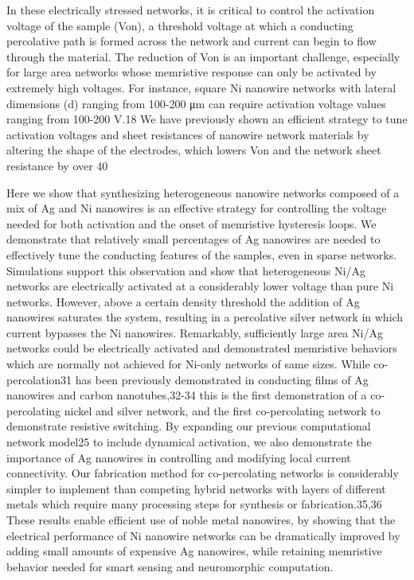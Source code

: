 In these electrically stressed networks, it is critical to control the activation voltage of the sample (Von), a threshold voltage at which a conducting percolative path is formed across the network and current can begin to flow through the material. The reduction of Von is an important challenge, especially for large area networks whose memristive response can only be activated by extremely high voltages. For instance, square Ni nanowire networks with lateral dimensions (d) ranging from 100-200 μm can require activation voltage values ranging from 100-200 V.18 We have previously shown an efficient strategy to tune activation voltages and sheet resistances of nanowire network materials by altering the shape of the electrodes, which lowers Von and the network sheet resistance by over 40%

Here we show that synthesizing heterogeneous nanowire networks composed of a mix of Ag and Ni nanowires is an effective strategy for controlling the voltage needed for both activation and the onset of memristive hysteresis loops. We demonstrate that relatively small percentages of Ag nanowires are needed to effectively tune the conducting features of the samples, even in sparse networks. Simulations support this observation and show that heterogeneous Ni/Ag networks are electrically activated at a considerably lower voltage than pure Ni networks. However, above a certain density threshold the addition of Ag nanowires saturates the system, resulting in a percolative silver network in which current bypasses the Ni nanowires. Remarkably, sufficiently large area Ni/Ag networks could be electrically activated and demonstrated memristive behaviors which are normally not achieved for Ni-only networks of same sizes. While co-percolation31 has been previously demonstrated in conducting films of Ag nanowires and carbon nanotubes,32-34 this is the first demonstration of a co-percolating nickel and silver network, and the first co-percolating network to demonstrate resistive switching. By expanding our previous computational network model25 to include dynamical activation, we also demonstrate the importance of Ag nanowires in controlling and modifying local current connectivity. Our fabrication method for co-percolating networks is considerably simpler to implement than competing hybrid networks with layers of different metals which require many processing steps for synthesis or fabrication.35,36 These results enable efficient use of noble metal nanowires, by showing that the electrical performance of Ni nanowire networks can be dramatically improved by adding small amounts of expensive Ag nanowires, while retaining memristive behavior needed for smart sensing and neuromorphic computation.
